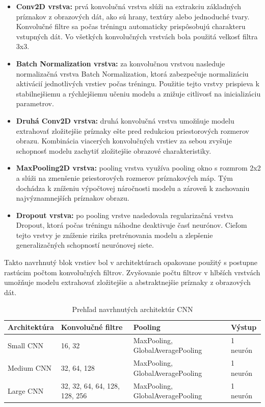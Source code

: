 \begin{itemize}
    \item \textbf{Conv2D vrstva:} 
    prvá konvolučná vrstva slúži na extrakciu základných príznakov z obrazových dát, ako sú hrany, textúry alebo jednoduché tvary. Konvolučné filtre sa počas tréningu automaticky prispôsobujú charakteru vstupných dát. Vo všetkých konvolučných vrstvách bola použitá velkosť filtra 3x3. 

    \item \textbf{Batch Normalization vrstva:} 
    za konvolučnou vrstvou nasleduje normalizačná vrstva Batch Normalization, ktorá zabezpečuje normalizáciu aktivácií jednotlivých vrstiev počas tréningu. Použitie tejto vrstvy prispieva k stabilnejšiemu a rýchlejšiemu učeniu modelu a znižuje citlivosť na inicializáciu parametrov.

    \item \textbf{Druhá Conv2D vrstva:} 
    druhá konvolučná vrstva umožňuje modelu extrahovať zložitejšie príznaky ešte pred redukciou priestorových rozmerov obrazu. Kombinácia viacerých konvolučných vrstiev za sebou zvyšuje schopnosť modelu zachytiť zložitejšie obrazové charakteristiky.

    \item \textbf{MaxPooling2D vrstva:} 
    pooling vrstva využíva pooling okno s rozmrom 2x2 a slúži na zmenšenie priestorových rozmerov príznakových máp. Tým dochádza k zníženiu výpočtovej náročnosti modelu a zároveň k zachovaniu najvýznamnejších príznakov obrazu.

    \item \textbf{Dropout vrstva:} 
    po pooling vrstve nasledovala regularizačná vrstva Dropout, ktorá počas tréningu náhodne deaktivuje časť neurónov. Cieľom tejto vrstvy je zníženie rizika pretrénovania modelu a zlepšenie generalizačných schopností neurónovej siete.
\end{itemize}

Takto navrhnutý blok vrstiev bol v architektúrach opakovane použitý s postupne rastúcim počtom konvolučných filtrov. Zvyšovanie počtu filtrov v hlbších vrstvách umožňuje modelu extrahovať zložitejšie a abstraktnejšie príznaky z obrazových dát.

\begin{table}[H]
\centering
\caption{Prehľad navrhnutých architektúr CNN}
\begin{tabular}{|l|l|l|l|}
\hline
\textbf{Architektúra} & \textbf{Konvolučné filtre} & \textbf{Pooling} & \textbf{Výstup} \\ \hline
Small CNN & 16, 32 & MaxPooling, GlobalAveragePooling & 1 neurón \\ \hline
Medium CNN & 32, 64, 128 & MaxPooling, GlobalAveragePooling & 1 neurón \\ \hline
Large CNN & 32, 32, 64, 64, 128, 128, 256 & MaxPooling, GlobalAveragePooling & 1 neurón \\ \hline
\end{tabular}\label{tab:cnn_architectures}
\end{table}


